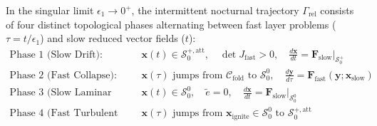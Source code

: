 \begin{theorem}
\label{thm:relaxation_cycle}
In the singular limit $\epsilon_1 \to 0^+$, the intermittent nocturnal trajectory $\Gamma_{\mathrm{rel}}$ consists of four distinct topological phases alternating between fast layer problems ($\tau = t / \epsilon_1$) and slow reduced vector fields ($t$):
\begin{align}
\text{Phase 1 (Slow Drift):} &\quad \mathbf{x}(t) \in \mathcal{S}_0^{+,\mathrm{att}}, \quad \det J_{\mathrm{fast}} > 0, \quad \frac{d\mathbf{x}}{dt} = \mathbf{F}_{\mathrm{slow}}\vert_{\mathcal{S}_0^+} \\[4pt]
\text{Phase 2 (Fast Collapse):} &\quad \mathbf{x}(\tau) \text{ jumps from } \mathcal{C}_{\mathrm{fold}} \text{ to } \mathcal{S}_0^0, \quad \frac{d\mathbf{y}}{d\tau} = \mathbf{F}_{\mathrm{fast}}(\mathbf{y}; \mathbf{x}_{\mathrm{slow}}) \\[4pt]
\text{Phase 3 (Slow Laminar Accumulation):} &\quad \mathbf{x}(t) \in \mathcal{S}_0^0, \quad \tilde e = 0, \quad \frac{d\mathbf{x}}{dt} = \mathbf{F}_{\mathrm{slow}}\vert_{\mathcal{S}_0^0} \\[4pt]
\text{Phase 4 (Fast Turbulent Bursting):} &\quad \mathbf{x}(\tau) \text{ jumps from } \mathbf{x}_{\mathrm{ignite}} \in \mathcal{S}_0^0 \text{ to } \mathcal{S}_0^{+,\mathrm{att}}
\end{align}
\end{theorem}

